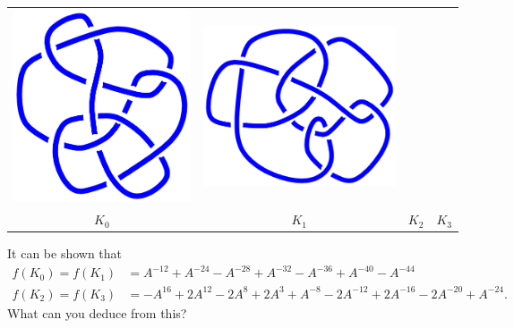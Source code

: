 \documentclass[a4paper]{amsart}
\begin{document}
\begin{exercise}
\begin{center}
\begin{tabular}{cccc}
   \includegraphics[scale=0.1]{../images/Conway.pdf} &
   \includegraphics[scale=0.1]{../images/Kinoshita.pdf} \\
   $K_0$ & $K_1$ & $K_2$ & $K_3$ 
  \end{tabular}
 \end{center}
 It can be shown that 
 \begin{align*}
  f(K_0) = f(K_1) &= A^{-12} + A^{-24} - A^{-28} + A^{-32} - A^{-36} + A^{-40} - A^{-44} \\
  f(K_2) = f(K_3) &= -A^{16} + 2A^{12}-2A^{8} + 2A^3 + A^{-8}-2A^{-12} + 2A^{-16}-2A^{-20} + A^{-24}.
 \end{align*}
 What can you deduce from this?
\end{exercise}
\end{document}
